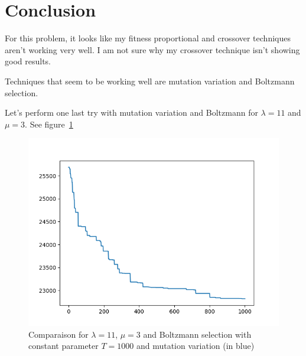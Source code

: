 \documentclass{article}
\theoremstyle{plain} %
\theoremstyle{definition} %
\begin{document}
\section{Conclusion}

For this problem, it looks like my fitness proportional and crossover
techniques aren't working very well. I am not sure why my crossover technique
isn't showing good results.

Techniques that seem to be working well are mutation variation and Boltzmann
selection.

Let's perform one last try with mutation variation and Boltzmann for $\lambda
= 11 $ and $\mu = 3$. See figure~\ref{MutationBoltzmann}

\begin{figure}
\centering
\includegraphics[scale=.6]{../Plots/new/11,3,mut,Boltzmann.png}
\caption{Comparaison for $\lambda = 11$, $\mu = 3$ and Boltzmann selection with
constant parameter $T = 1000$ and mutation variation (in blue)}
\label{MutationBoltzmann}
\end{figure}
\end{document}
